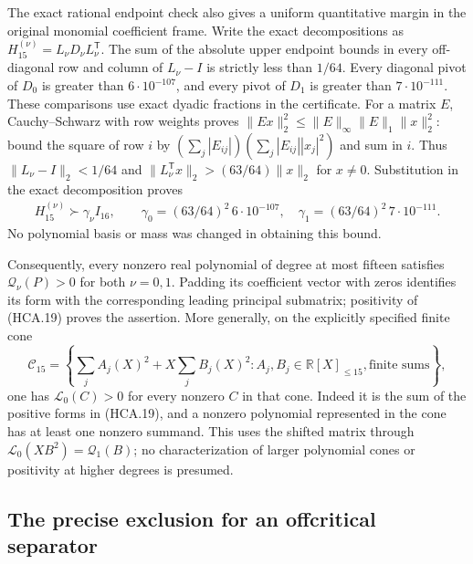 The exact rational endpoint check also gives a uniform quantitative
margin in the original monomial coefficient frame. Write the exact
decompositions as $H_{15}^{(\nu)}=L_\nu D_\nu L_\nu^{\mathsf T}$.
The sum of the absolute upper endpoint bounds in every off-diagonal
row and column of $L_\nu-I$ is strictly less than $1/64$.
Every diagonal pivot of $D_0$ is greater than $6\cdot10^{-107}$,
and every pivot of $D_1$ is greater than $7\cdot10^{-111}$.
These comparisons use exact dyadic fractions in the certificate.
For a matrix $E$, Cauchy--Schwarz with row weights proves
$\|Ex\|_2^2\leq\|E\|_\infty\|E\|_1\|x\|_2^2$:
bound the square of row $i$ by
$(\sum_j|E_{ij}|)(\sum_j|E_{ij}||x_j|^2)$ and sum in $i$.
Thus $\|L_\nu-I\|_2<1/64$ and
$\|L_\nu^{\mathsf T}x\|_2>(63/64)\|x\|_2$ for $x\ne0$.
Substitution in the exact decomposition proves
\[
 \begin{gathered}
 H_{15}^{(\nu)}\succ\gamma_\nu I_{16},\qquad
 \gamma_0=(63/64)^2\,6\cdot10^{-107},\quad
 \gamma_1=(63/64)^2\,7\cdot10^{-111}.
 \end{gathered}
 \tag{HCA.19a}
\]
No polynomial basis or mass was changed in obtaining this bound.

Consequently, every nonzero real polynomial of degree at most
fifteen satisfies $\mathcal Q_\nu(P)>0$ for both $\nu=0,1$.
Padding its coefficient vector with zeros identifies its form
with the corresponding leading principal submatrix; positivity
of (HCA.19) proves the assertion. More generally, on the explicitly
specified finite cone
\[
 \mathscr C_{15}=\left\{\sum_j A_j(X)^2+X\sum_j B_j(X)^2:
          A_j,B_j\in\mathbb{R}[X]_{\leq15},
          \text{finite sums}\right\},
 \tag{HCA.20}
\]
one has $\mathcal L_0(C)>0$ for every nonzero $C$ in that cone.
Indeed it is the sum of the positive forms in (HCA.19), and a
nonzero polynomial represented in the cone has at least one
nonzero summand. This uses the shifted matrix through
$\mathcal L_0(XB^2)=\mathcal Q_1(B)$; no characterization of
larger polynomial cones or positivity at higher degrees is presumed.

\subsection{The precise exclusion for an offcritical separator}

